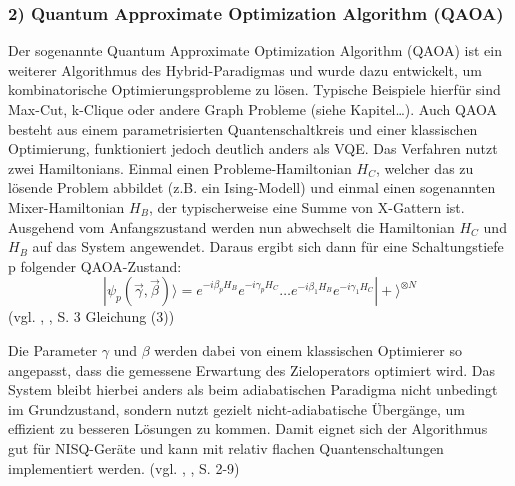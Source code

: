 \subsubsection*{2) Quantum Approximate Optimization Algorithm (QAOA)}
Der sogenannte Quantum Approximate Optimization Algorithm (QAOA) ist ein weiterer Algorithmus des Hybrid-Paradigmas und wurde dazu entwickelt, um kombinatorische Optimierungsprobleme zu lösen. Typische Beispiele hierfür sind Max-Cut, k-Clique oder andere Graph Probleme (siehe Kapitel…). Auch QAOA besteht aus einem parametrisierten Quantenschaltkreis und einer klassischen Optimierung, funktioniert jedoch deutlich anders als VQE.
Das Verfahren nutzt zwei Hamiltonians. Einmal einen Probleme-Hamiltonian $H_C$, welcher das zu lösende Problem abbildet (z.B. ein Ising-Modell) und einmal einen sogenannten Mixer-Hamiltonian $H_B$, der typischerweise eine Summe von X-Gattern ist. Ausgehend vom Anfangszustand werden nun abwechselt die Hamiltonian $H_C$ und $H_B$ auf das System angewendet. Daraus ergibt sich dann für eine Schaltungstiefe p folgender QAOA-Zustand: 
$$
|\psi_p(\vec{\gamma}, \vec{\beta})\rangle = e^{-i\beta_p H_B}e^{-i\gamma_p H_C} \dots e^{-i\beta_1 H_B}e^{-i\gamma_1 H_C} |+\rangle^{\otimes N}
$$
(vgl. \citeauthor{zhou_quantum_nodate}, \citeyear{zhou_quantum_nodate}, S. 3 Gleichung (3))


Die Parameter $\gamma$ und $\beta$ werden dabei von einem klassischen Optimierer so angepasst, dass die gemessene Erwartung des Zieloperators optimiert wird. Das System bleibt hierbei anders als beim adiabatischen Paradigma nicht unbedingt im Grundzustand, sondern nutzt gezielt nicht-adiabatische Übergänge, um effizient zu besseren Lösungen zu kommen. Damit eignet sich der Algorithmus gut für NISQ-Geräte und kann mit relativ flachen Quantenschaltungen implementiert werden. 
(vgl. \citeauthor{zhou_quantum_nodate}, \citeyear{zhou_quantum_nodate}, S. 2-9)

